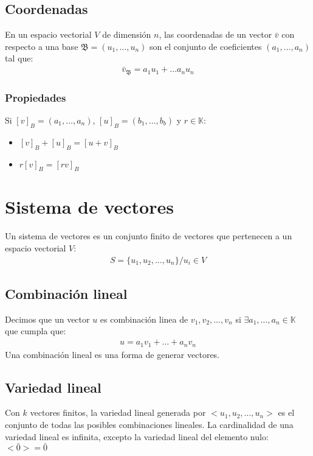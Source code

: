 \documentclass{article}
\begin{document}
\subsection{Coordenadas}
En un espacio vectorial $V$ de dimensión $n$, las coordenadas de un vector
$\bar{v}$ con respecto a una base $\mathfrak{B} = (u_{1},\dots,u_{n})$ son el conjunto de
coeficientes $(a_{1},\dots,a_{n})$ tal que:
\begin{equation}
    \begin{split}
        \bar{v}_{\mathfrak{B}} = a_{1}u_{1}+\dots a_{n}u_{n}
    \end{split}
\end{equation}
\subsubsection{Propiedades}
Si $[v]_{B} = (a_{1},\dots,a_{n})$, $[u]_{B} = (b_{1},\dots,b_{b})$ y $r \in \mathbb{K}$:
\begin{itemize}
    \item $[v]_{B} + [u]_{B} = [u+v]_{B}$
    \item $r[v]_{B}=[rv]_{B}$
\end{itemize}

\section{Sistema de vectores}
Un sistema de vectores es un conjunto finito de vectores que pertenecen a un espacio vectorial $V$:
\begin{equation}
    \begin{split}
        S=\{ u_{1},u_{2},\dots,u_{n} \} / u_{i} \in V
    \end{split}
\end{equation}
\subsection{Combinación lineal}
Decimos que un vector $u$ es combinación linea de $v_{1},v_{2},\dots,v_{n}$ si
$\exists a_{1}, \dots,a_{n} \in \mathbb{K}$ que cumpla que:
\begin{equation}
    \begin{split}
        u=a_{1}v_{1}+ \dots +a_{n}v_{n}
    \end{split}
\end{equation}
Una combinación lineal es una forma de generar vectores.
\subsection{Variedad lineal}
Con $k$ vectores finitos, la variedad lineal generada por $<u_{1},u_{2},\dots,u_{n}>$ es el
conjunto de todas las posibles combinaciones lineales. La cardinalidad de una variedad lineal
es infinita, excepto la variedad lineal del elemento nulo: $<\bar{0}>= \bar{0}$
\end{document}
